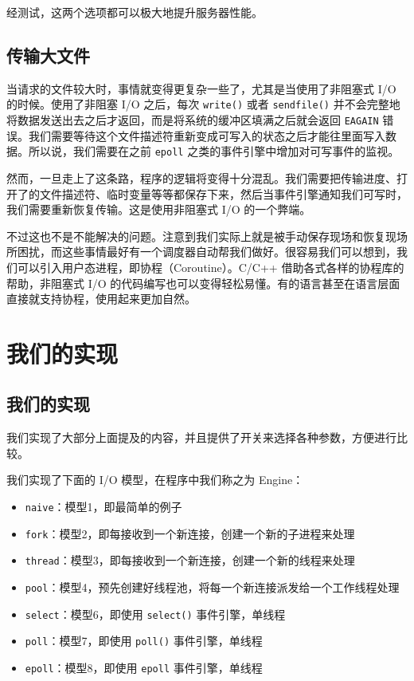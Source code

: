 \documentclass[a4paper]{article}
\providecommand{\tightlist}{\setlength{\itemsep}{0pt}\setlength{\parskip}{0pt}}
\begin{document}
经测试，这两个选项都可以极大地提升服务器性能。

\subsection{传输大文件}

当请求的文件较大时，事情就变得更复杂一些了，尤其是当使用了非阻塞式 I/O 的时候。使用了非阻塞 I/O 之后，每次 \texttt{write()} 或者 \texttt{sendfile()} 并不会完整地将数据发送出去之后才返回，而是将系统的缓冲区填满之后就会返回 \texttt{EAGAIN} 错误。我们需要等待这个文件描述符重新变成可写入的状态之后才能往里面写入数据。所以说，我们需要在之前 \texttt{epoll} 之类的事件引擎中增加对可写事件的监视。

然而，一旦走上了这条路，程序的逻辑将变得十分混乱。我们需要把传输进度、打开了的文件描述符、临时变量等等都保存下来，然后当事件引擎通知我们可写时，我们需要重新恢复传输。这是使用非阻塞式 I/O 的一个弊端。

不过这也不是不能解决的问题。注意到我们实际上就是被手动保存现场和恢复现场所困扰，而这些事情最好有一个调度器自动帮我们做好。很容易我们可以想到，我们可以引入用户态进程，即协程（Coroutine）。C/C++ 借助各式各样的协程库的帮助，非阻塞式 I/O 的代码编写也可以变得轻松易懂。有的语言甚至在语言层面直接就支持协程，使用起来更加自然。

\section{我们的实现}

\subsection{我们的实现}

我们实现了大部分上面提及的内容，并且提供了开关来选择各种参数，方便进行比较。

我们实现了下面的 I/O 模型，在程序中我们称之为 Engine：

\begin{itemize}
\tightlist
\item
  \texttt{naive}：模型1，即最简单的例子
\item
  \texttt{fork}：模型2，即每接收到一个新连接，创建一个新的子进程来处理
\item
  \texttt{thread}：模型3，即每接收到一个新连接，创建一个新的线程来处理
\item
  \texttt{pool}：模型4，预先创建好线程池，将每一个新连接派发给一个工作线程处理
\item
  \texttt{select}：模型6，即使用 \texttt{select()} 事件引擎，单线程
\item
  \texttt{poll}：模型7，即使用 \texttt{poll()} 事件引擎，单线程
\item
  \texttt{epoll}：模型8，即使用 \texttt{epoll} 事件引擎，单线程
\end{itemize}
\end{document}
